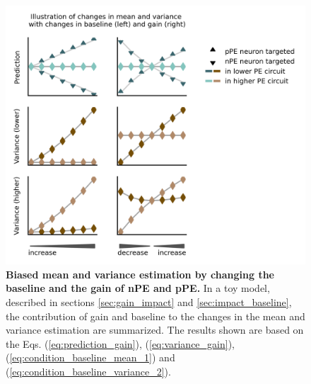 \documentclass[10pt,a4paper]{article}
\begin{document}
\begin{figure}[!h]
	\centering
    \includegraphics{../results/figures/final/Fig_4_S3}%
\caption{\footnotesize{\bf Biased mean and variance estimation by changing the baseline and the gain of nPE and pPE.}
In a toy model, described in sections \ref{sec:gain_impact} and \ref{sec:impact_baseline}, the contribution of gain and baseline to the changes in the mean and variance estimation are summarized. The results shown are based on the Eqs. (\ref{eq:prediction_gain}), (\ref{eq:variance_gain}), (\ref{eq:condition_baseline_mean_1}) and  (\ref{eq:condition_baseline_variance_2}).
}
\label{fig:Fig_4_S3}
\end{figure}
\end{document}
